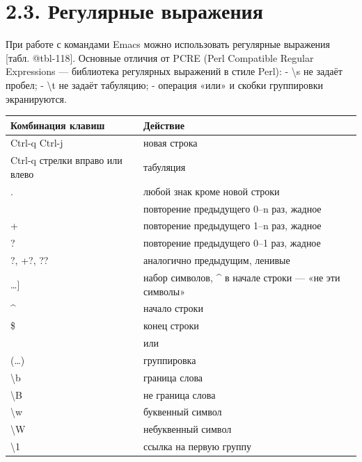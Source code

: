 \documentclass[
  english,
  russian,
  12pt,
  a4paper,
]{scrreprt}
\begin{document}
\section{2.3. Регулярные
выражения}\label{ux440ux435ux433ux443ux43bux44fux440ux43dux44bux435-ux432ux44bux440ux430ux436ux435ux43dux438ux44f}

При работе с командами Emacs можно использовать регулярные выражения
{[}табл. @tbl-118{]}. Основные отличия от PCRE (Perl Compatible Regular
Expressions --- библиотека регулярных выражений в стиле Perl): -
\textbackslash s не задаёт пробел; - \textbackslash t не задаёт
табуляцию; - операция «или» и скобки группировки экранируются.

\begin{longtable}[]{@{}
  >{\raggedright\arraybackslash}p{}
  >{\raggedright\arraybackslash}p{}@{}}
\toprule\noalign{}
\begin{minipage}[b]{\linewidth}\raggedright
Комбинация клавиш
\end{minipage} & \begin{minipage}[b]{\linewidth}\raggedright
Действие
\end{minipage} \\
\midrule\noalign{}
\endhead
\bottomrule\noalign{}
\endlastfoot
Ctrl-q Ctrl-j & новая строка \\
Ctrl-q стрелки вправо или влево & табуляция \\
. & любой знак кроме новой строки \\
* & повторение предыдущего 0--n раз, жадное \\
+ & повторение предыдущего 1--n раз, жадное \\
? & повторение предыдущего 0--1 раз, жадное \\
*?, +?, ?? & аналогично предыдущим, ленивые \\
{[}\ldots{]} & набор символов, \^{} в начале строки --- «не эти
символы» \\
\^{} & начало строки \\
\$ & конец строки \\
\textbar{} & или \\
(\ldots) & группировка \\
\textbackslash b & граница слова \\
\textbackslash B & не граница слова \\
\textbackslash w & буквенный символ \\
\textbackslash W & небуквенный символ \\
\textbackslash1 & ссылка на первую группу \\
\end{longtable}
\end{document}
